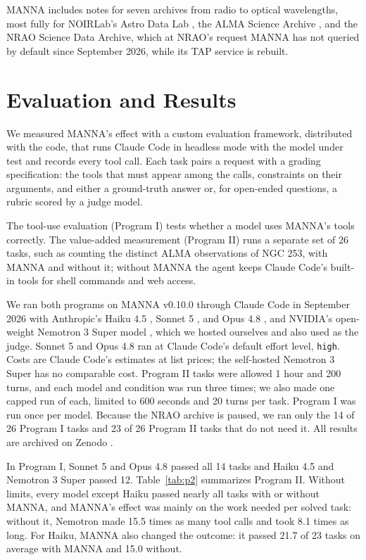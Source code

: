 \documentclass[11pt,twoside]{article}
\begin{document}
MANNA includes notes for seven archives from radio to optical wavelengths, most fully for NOIRLab's Astro Data Lab \citep{2020A&C....3300411N}, the ALMA Science Archive \citep{2025ASPC..538..206S}, and the NRAO Science Data Archive, which at NRAO's request MANNA has not queried by default since September 2026, while its TAP service is rebuilt.

\section{Evaluation and Results}
\label{sec:eval}
We measured MANNA's effect with a custom evaluation framework, distributed with the code, that runs Claude Code \citep{claudecode} in headless mode with the model under test and records every tool call. Each task pairs a request with a grading specification: the tools that must appear among the calls, constraints on their arguments, and either a ground-truth answer or, for open-ended questions, a rubric scored by a judge model.

The tool-use evaluation (Program I) tests whether a model uses MANNA's tools correctly. The value-added measurement (Program II) runs a separate set of 26 tasks, such as counting the distinct ALMA observations of NGC 253, with MANNA and without it; without MANNA the agent keeps Claude Code's built-in tools for shell commands and web access.

We ran both programs on MANNA v0.10.0 through Claude Code in September 2026 with Anthropic's Haiku 4.5 \citep{Anthropic2025haiku45}, Sonnet 5 \citep{Anthropic2026sonnet5}, and Opus 4.8 \citep{Anthropic2026opus48}, and NVIDIA's open-weight Nemotron 3 Super model \citep{2026arXiv260412374N}, which we hosted ourselves and also used as the judge. Sonnet 5 and Opus 4.8 ran at Claude Code's default effort level, \texttt{high}. Costs are Claude Code's estimates at list prices; the self-hosted Nemotron 3 Super has no comparable cost. Program II tasks were allowed 1 hour and 200 turns, and each model and condition was run three times; we also made one capped run of each, limited to 600 seconds and 20 turns per task. Program I was run once per model. Because the NRAO archive is paused, we ran only the 14 of 26 Program I tasks and 23 of 26 Program II tasks that do not need it. All results are archived on Zenodo \citep{manna2026evals}.

In Program I, Sonnet 5 and Opus 4.8 passed all 14 tasks and Haiku 4.5 and Nemotron 3 Super passed 12. Table~\ref{tab:p2} summarizes Program II. Without limits, every model except Haiku passed nearly all tasks with or without MANNA, and MANNA's effect was mainly on the work needed per solved task: without it, Nemotron made 15.5 times as many tool calls and took 8.1 times as long. For Haiku, MANNA also changed the outcome: it passed 21.7 of 23 tasks on average with MANNA and 15.0 without.
\end{document}

